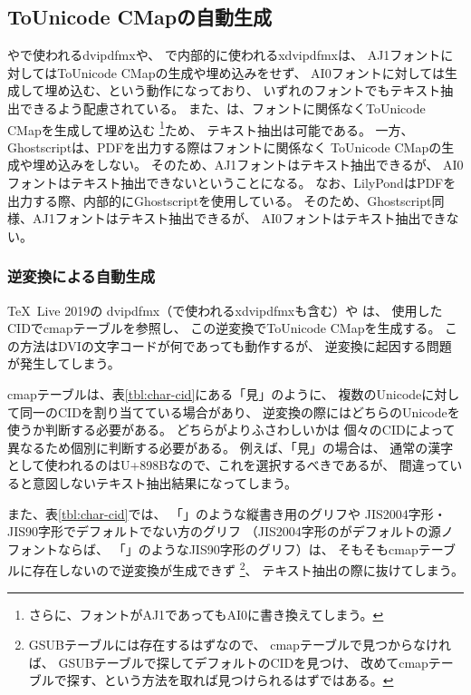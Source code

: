 \subsection{ToUnicode CMapの自動生成}

\pTeX や\upTeX で使われるdvipdfmxや、
\XeTeX で内部的に使われるxdvipdfmxは、
AJ1フォントに対してはToUnicode CMapの生成や埋め込みをせず、
AI0フォントに対しては生成して埋め込む、という動作になっており、
いずれのフォントでもテキスト抽出できるよう配慮されている。
また、\LuaTeX は、フォントに関係なくToUnicode CMapを生成して埋め込む
\footnote{さらに、フォントがAJ1であってもAI0に書き換えてしまう。}ため、
テキスト抽出は可能である。
一方、Ghostscriptは、PDFを出力する際はフォントに関係なく
ToUnicode CMapの生成や埋め込みをしない。
そのため、AJ1フォントはテキスト抽出できるが、
AI0フォントはテキスト抽出できないということになる。
なお、LilyPondはPDFを出力する際、内部的にGhostscriptを使用している。
そのため、Ghostscript同様、AJ1フォントはテキスト抽出できるが、
AI0フォントはテキスト抽出できない。

\subsubsection{逆変換による自動生成}

\TeX \ Live 2019の
dvipdfmx（\XeTeX で使われるxdvipdfmxも含む）や \LuaTeX は、
使用したCIDでcmapテーブルを参照し、
この逆変換でToUnicode CMapを生成する。
この方法はDVIの文字コードが何であっても動作するが、
逆変換に起因する問題が発生してしまう。

cmapテーブルは、表\ref{tbl:char-cid}にある「見」のように、
複数のUnicodeに対して同一のCIDを割り当てている場合があり、
逆変換の際にはどちらのUnicodeを使うか判断する必要がある。
どちらがよりふさわしいかは
個々のCIDによって異なるため個別に判断する必要がある。
例えば、「見」の場合は、
通常の漢字として使われるのはU+898Bなので、これを選択するべきであるが、
間違っていると意図しないテキスト抽出結果になってしまう。

また、表\ref{tbl:char-cid}では、
「{\gtfamily {}}」のような縦書き用のグリフや
JIS2004字形・JIS90字形でデフォルトでない方のグリフ
（JIS2004字形のがデフォルトの源ノフォントならば、
  「」のようなJIS90字形のグリフ）は、
そもそもcmapテーブルに存在しないので逆変換が生成できず
\footnote{GSUBテーブルには存在するはずなので、
  cmapテーブルで見つからなければ、
  GSUBテーブルで探してデフォルトのCIDを見つけ、
  改めてcmapテーブルで探す、という方法を取れば見つけられるはずではある。}、
テキスト抽出の際に抜けてしまう。

